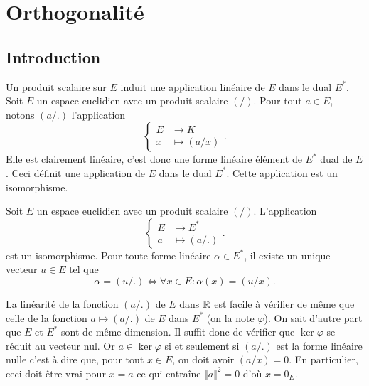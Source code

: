 \section{Orthogonalité}
\subsection{Introduction}
Un produit scalaire sur $E$ induit une application linéaire de $E$ dans le dual $E^*$. Soit $E$ un espace euclidien avec un produit scalaire $(/)$. Pour tout $a\in E$, notons $(a/.)$ l'application 
\begin{displaymath}
 \left\lbrace 
\begin{aligned}
 E &\rightarrow K \\ x &\mapsto (a/x)
\end{aligned}
\right. .
\end{displaymath}
Elle est clairement linéaire, c'est donc une forme linéaire élément de $E^*$ dual de $E$. Ceci définit une application de $E$ dans le dual $E^*$.
Cette application est un isomorphisme. 
\begin{prop}
 Soit $E$ un espace euclidien avec un produit scalaire $(/)$. L'application
\begin{displaymath}
 \left\lbrace 
\begin{aligned}
  E &\rightarrow E^* \\ a &\mapsto (a/.)
\end{aligned}
\right. .
\end{displaymath}
est un isomorphisme. Pour toute forme linéaire $\alpha\in E^*$, il existe un unique vecteur $u\in E$ tel que
\begin{displaymath}
 \alpha = (u/ .)\Leftrightarrow
\forall x\in E : \alpha(x) = (u/x) .
\end{displaymath}
\end{prop}
\begin{demo}
 La linéarité de la fonction $(a/.)$ de $E$ dans $\mathbb{R}$ est facile à vérifier de même que celle de la fonction $a \mapsto (a/.)$ de $E$ dans $E^*$ (on la note $\varphi$). On sait d'autre part que $E$ et $E^*$ sont de même dimension. Il suffit donc de vérifier que $\ker \varphi$ se réduit au vecteur nul. Or $a\in\ker \varphi$ si et seulement si $(a/.)$ est la forme linéaire nulle c'est à dire que, pour tout $x\in E$, on doit avoir $(a/x)=0$. En particulier, ceci doit être vrai pour $x=a$ ce qui entraîne $\Vert a\Vert^2=0$ d'où $x=0_E$.
\end{demo}

